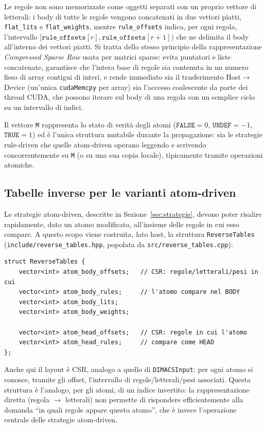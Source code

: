 \documentclass[11pt,a4paper]{article}
\begin{document}
Le regole non sono memorizzate come oggetti separati con un proprio vettore di letterali: i body di
tutte le regole vengono concatenati in due vettori piatti, \texttt{flat\_lits} e
\texttt{flat\_weights}, mentre \texttt{rule\_offsets} indica, per ogni regola, l'intervallo
$[\texttt{rule\_offsets}[r], \texttt{rule\_offsets}[r+1])$ che ne delimita il body all'interno dei
vettori piatti. Si tratta dello stesso principio della rappresentazione \emph{Compressed Sparse
Row} usata per matrici sparse: evita puntatori e liste concatenate, garantisce che l'intera base di
regole sia contenuta in un numero fisso di array contigui di interi, e rende immediato sia il
trasferimento Host$\to$Device (un'unica \texttt{cudaMemcpy} per array) sia l'accesso coalescente da
parte dei thread CUDA, che possono iterare sul body di una regola con un semplice ciclo su un
intervallo di indici.

Il vettore \texttt{M} rappresenta lo stato di verità degli atomi ($\texttt{FALSE}=0$,
$\texttt{UNDEF}=-1$, $\texttt{TRUE}=1$) ed è l'unica struttura mutabile durante la propagazione:
sia le strategie rule-driven che quelle atom-driven operano leggendo e scrivendo concorrentemente
su \texttt{M} (o su una sua copia locale), tipicamente tramite operazioni atomiche.

\subsection{Tabelle inverse per le varianti atom-driven}

Le strategie atom-driven, descritte in Sezione~\ref{sec:strategie}, devono poter risalire
rapidamente, dato un atomo modificato, all'insieme delle regole in cui esso compare. A questo scopo
viene costruita, lato host, la struttura \texttt{ReverseTables}
(\texttt{include/reverse\_tables.hpp}, popolata da \texttt{src/reverse\_tables.cpp}):

\begin{lstlisting}
struct ReverseTables {
    vector<int> atom_body_offsets;   // CSR: regole/letterali/pesi in cui
    vector<int> atom_body_rules;     // l'atomo compare nel BODY
    vector<int> atom_body_lits;
    vector<int> atom_body_weights;

    vector<int> atom_head_offsets;   // CSR: regole in cui l'atomo
    vector<int> atom_head_rules;     // compare come HEAD
};
\end{lstlisting}

Anche qui il layout è CSR, analogo a quello di \texttt{DIMACSInput}: per ogni atomo si conosce,
tramite gli offset, l'intervallo di regole/letterali/pesi associati. Questa struttura è l'analogo,
per gli atomi, di un indice invertito: la rappresentazione diretta (regola $\to$ letterali) non
permette di rispondere efficientemente alla domanda ``in quali regole appare questo atomo'', che è
invece l'operazione centrale delle strategie atom-driven.
\end{document}
